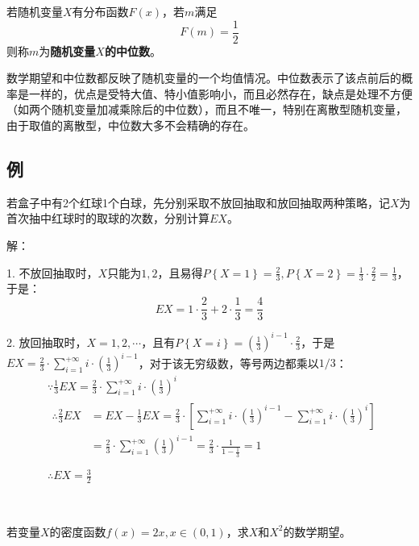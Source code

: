 \begin{definition}[中位数]
若随机变量$X$有分布函数$F\left( x \right) $，若$m$满足
\[
F\left( m \right) =\frac{1}{2}
\]
则称$m$为{\bf 随机变量$X$的中位数}。
\end{definition}

数学期望和中位数都反映了随机变量的一个均值情况。中位数表示了该点前后的概率是一样的，优点是受特大值、特小值影响小，而且必然存在，缺点是处理不方便（如两个随机变量加减乘除后的中位数），而且不唯一，特别在离散型随机变量，由于取值的离散型，中位数大多不会精确的存在。

\subsection{例}

\begin{example}
若盒子中有2个红球1个白球，先分别采取不放回抽取和放回抽取两种策略，记$X$为首次抽中红球时的取球的次数，分别计算$EX$。
\end{example}

解：

1. 不放回抽取时，$X$只能为$1,2$，且易得$P\left\{ X=1 \right\} =\frac{2}{3},P\left\{ X=2 \right\} =\frac{1}{3}\cdot \frac{2}{2}=\frac{1}{3}$，于是：
\[
EX=1\cdot \frac{2}{3}+2\cdot \frac{1}{3}=\frac{4}{3}
\]

2. 放回抽取时，$X=1,2,\cdots $，且有$P\left\{ X=i \right\} =\left( \frac{1}{3} \right) ^{i-1}\cdot \frac{2}{3}$，于是$EX=\frac{2}{3}\cdot \sum_{i=1}^{+\infty}{i\cdot \left( \frac{1}{3} \right) ^{i-1}}$，对于该无穷级数，等号两边都乘以$1/3$：
\begin{align*}
&\because \frac{1}{3}EX=\frac{2}{3}\cdot \sum_{i=1}^{+\infty}{i\cdot \left( \frac{1}{3} \right) ^i} \\
&\begin{aligned}
	\therefore \frac{2}{3}EX&=EX-\frac{1}{3}EX=\frac{2}{3}\cdot \left[ \sum_{i=1}^{+\infty}{i\cdot \left( \frac{1}{3} \right) ^{i-1}}-\sum_{i=1}^{+\infty}{i\cdot \left( \frac{1}{3} \right) ^i} \right]\\
	&=\frac{2}{3}\cdot \sum_{i=1}^{+\infty}{\left( \frac{1}{3} \right) ^{i-1}}=\frac{2}{3}\cdot \frac{1}{1-\frac{1}{3}}=1\\
\end{aligned} \\
&\therefore EX=\frac{3}{2}
\end{align*}

~

\begin{example}
若变量$X$的密度函数$f\left( x \right) =2x,x\in \left( 0,1 \right) $，求$X$和$X^2$的数学期望。
\end{example}

